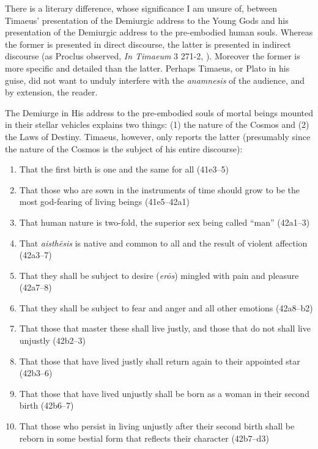 There is a literary difference, whose significance I am unsure of, between Timaeus' presentation of the Demiurgic address to the Young Gods and his presentation of the Demiurgic address to the pre-embodied human souls. Whereas the former is presented in direct discourse, the latter is presented in indirect discourse (as Proclus observed, \emph{In Timaeum} 3 271-2, \citealt{Diehl:1903re}). Moreover the former is more specific and detailed than the latter. Perhaps Timaeus, or Plato in his guise, did not want to unduly interfere with the \emph{anamnesis} of the audience, and by extension, the reader.

The Demiurge in His address to the pre-embodied souls of mortal beings mounted in their stellar vehicles explains two things: (1) the nature of the Cosmos and (2) the Laws of Destiny. Timaeus, however, only reports the latter (presumably since the nature of the Cosmos is the subject of his entire discourse):
\begin{enumerate}[(1)]
	\item That the first birth is one and the same for all (41e3--5)
	\item That those who are sown in the instruments of time should grow to be the most god-fearing of living beings (41e5--42a1)
	\item That human nature is two-fold, the superior sex being called ``man'' (42a1--3)
	\item That \emph{aisthēsis} is native and common to all and the result of violent affection (42a3--7)
	\item That they shall be subject to desire (\emph{erōs}) mingled with pain and pleasure (42a7--8)
	\item That they shall be subject to fear and anger and all other emotions (42a8--b2)
	\item That those that master these shall live justly, and those that do not shall live unjustly (42b2--3)
	\item That those that have lived justly shall return again to their appointed star (42b3--6)
	\item That those that have lived unjustly shall be born as a woman in their second birth (42b6--7)
	\item That those who persist in living unjustly after their second birth shall be reborn in some bestial form that reflects their character (42b7--d3)
\end{enumerate}
